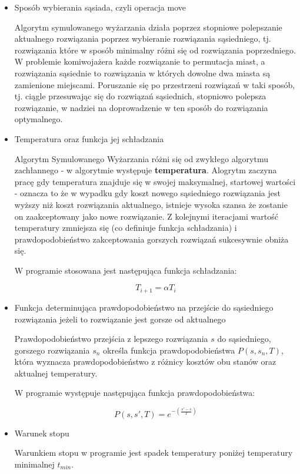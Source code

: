 \documentclass[a4paper]{article}
\begin{document}
\begin{itemize}
      \item Sposób wybierania sąsiada, czyli operacja move

            Algorytm symulowanego wyżarzania działa poprzez stopniowe polepszanie
            aktualnego rozwiązania poprzez wybieranie rozwiązania sąsiedniego, tj.
            rozwiązania które w sposób minimalny różni się od rozwiązania
            poprzedniego. W problemie komiwojażera każde rozwiązanie to permutacja
            miast, a rozwiązania sąsiednie to rozwiązania w których dowolne dwa
            miasta są zamienione miejscami. Poruszanie się po przestrzeni
            rozwiązań w taki sposób, tj. ciągle przesuwając się do rozwiązań
            sąsiednich, stopniowo polepsza rozwiązanie, w nadziei na doprowadzenie
            w ten sposób do rozwiązania optymalnego.

      \item Temperatura oraz funkcja jej schładzania

            Algorytm Symulowanego Wyżarzania różni się od zwykłego algorytmu
            zachłannego - w algorytmie występuje \textbf{temperatura}. Alogrytm
            zaczyna pracę gdy temperatura znajduje się w swojej maksymalnej,
            startowej wartości - oznacza to że w wypadku gdy koszt nowego
            sąsiedniego rozwiązania jest wyższy niż koszt rozwiązania aktualnego,
            istnieje wysoka szansa że zostanie on zaakceptowany jako nowe
            rozwiązanie. Z kolejnymi iteracjami wartość temperatury zmniejsza się
            (co definiuje funkcja schładzania) i prawdopodobieństwo zakceptowania
            gorszych rozwiązań sukcesywnie obniża się.

            W programie stosowana jest następująca funkcja schładzania:

            \[T_{i+1} = \alpha T_i\]

      \item Funkcja determinująca prawdopodobieństwo na przejście do sąsiedniego
            rozwiązania jeżeli to rozwiązanie jest gorsze od aktualnego

            Prawdopodobieństwo przejścia z lepszego rozwiązania $s$ do
            sąsiedniego, gorszego rozwiązania $s_n$ określa funkcja
            prawdopodobieństwa $P(s, s_n, T)$, która wyznacza prawdopodobieństwo z
            różnicy kosztów obu stanów oraz aktualnej temperatury.

            W programie występuje następująca funkcja prawdopodobieństwa:

            \[P(s, s', T) = e^{-(\frac{s' - s}{T})}\]

      \item Warunek stopu

            Warunkiem stopu w programie jest spadek temperatury poniżej temperatury
            minimalnej $t_{min}$.
\end{itemize}
\end{document}
